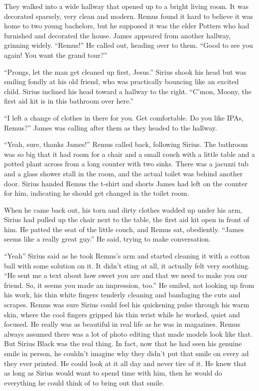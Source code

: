 \documentclass[12pt,twoside,openright]{memoir}
\begin{document}
They walked into a wide hallway that opened up to a bright living room. It was decorated sparsely, very clean and modern. Remus found it hard to believe it was home to two young bachelors, but he supposed it was the elder Potters who had furnished and decorated the house. James appeared from another hallway, grinning widely. ``Remus!'' He called out, heading over to them. ``Good to see you again! You want the grand tour?''

``Prongs, let the man get cleaned up first, Jesus.'' Sirius shook his head but was smiling fondly at his old friend, who was practically bouncing like an excited child. Sirius inclined his head toward a hallway to the right. ``C'mon, Moony, the first aid kit is in this bathroom over here.''

``I left a change of clothes in there for you. Get comfortable. Do you like IPAs, Remus?'' James was calling after them as they headed to the hallway.

``Yeah, sure, thanks James!'' Remus called back, following Sirius. The bathroom was so big that it had room for a chair and a small couch with a little table and a potted plant across from a long counter with two sinks. There was a jacuzzi tub and a glass shower stall in the room, and the actual toilet was behind another door. Sirius handed Remus the t-shirt and shorts James had left on the counter for him, indicating he should get changed in the toilet room.

When he came back out, his torn and dirty clothes wadded up under his arm, Sirius had pulled up the chair next to the table, the first aid kit open in front of him. He patted the seat of the little couch, and Remus sat, obediently.
``James seems like a really great guy.'' He said, trying to make conversation.

``Yeah'' Sirius said as he took Remus's arm and started cleaning it with a cotton ball with some solution on it. It didn't sting at all, it actually felt very soothing. ``He sent me a text about how sweet you are and that we need to make you our friend. So, it seems you made an impression, too.'' He smiled, not looking up from his work, his thin white fingers tenderly cleaning and bandaging the cuts and scrapes. Remus was sure Sirius could feel his quickening pulse through his warm skin, where the cool fingers gripped his thin wrist while he worked, quiet and focused. He really was as beautiful in real life as he was in magazines. Remus always assumed there was a lot of photo editing that made models look like that. But Sirius Black was the real thing. In fact, now that he had seen his genuine smile in person, he couldn't imagine why they didn't put that smile on every ad they ever printed. He could look at it all day and never tire of it. He knew that as long as Sirius would want to spend time with him, then he would do everything he could think of to bring out that smile.
\end{document}

